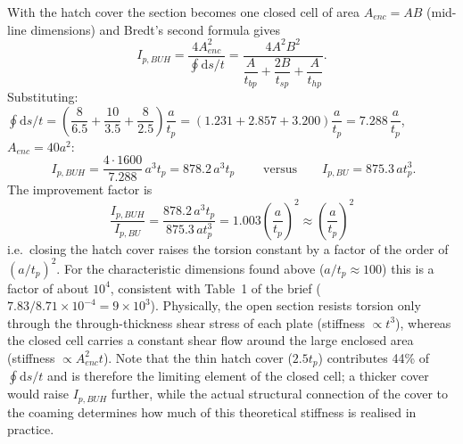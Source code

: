 \bigskip
With the hatch cover the section becomes one closed cell of area $A_{enc}=AB$ (mid-line dimensions) and Bredt's second formula gives
\begin{equation}
  I_{p,BUH}=\frac{4A_{enc}^2}{\oint\mathrm{d}s/t}=\frac{4A^2B^2}{\dfrac{A}{t_{bp}}+\dfrac{2B}{t_{sp}}+\dfrac{A}{t_{hp}}} .
\end{equation}
Substituting: $\oint\mathrm{d}s/t=\left(\dfrac{8}{6.5}+\dfrac{10}{3.5}+\dfrac{8}{2.5}\right)\dfrac{a}{t_p}=\left(1.231+2.857+3.200\right)\dfrac{a}{t_p}=7.288\,\dfrac{a}{t_p}$, $A_{enc}=40a^2$:
\begin{equation}
  \boxed{\;I_{p,BUH}=\frac{4\cdot1600}{7.288}\,a^3t_p=878.2\,a^3t_p\;}
  \qquad\text{versus}\qquad I_{p,BU}=875.3\,at_p^3 .
\end{equation}
The improvement factor is
\begin{equation}
  \boxed{\;\frac{I_{p,BUH}}{I_{p,BU}}=\frac{878.2\,a^3t_p}{875.3\,at_p^3}=1.003\left(\frac{a}{t_p}\right)^2\approx\left(\frac{a}{t_p}\right)^2\;}
\end{equation}
i.e.\ closing the hatch cover raises the torsion constant by a factor of the order of $(a/t_p)^2$. For the characteristic dimensions found above ($a/t_p\approx100$) this is a factor of about $10^4$, consistent with Table~1 of the brief ($7.83/8.71\times10^{-4}=9\times10^{3}$). Physically, the open section resists torsion only through the through-thickness shear stress of each plate (stiffness $\propto t^3$), whereas the closed cell carries a constant shear flow around the large enclosed area (stiffness $\propto A_{enc}^2t$). Note that the thin hatch cover ($2.5t_p$) contributes 44\% of $\oint\mathrm{d}s/t$ and is therefore the limiting element of the closed cell; a thicker cover would raise $I_{p,BUH}$ further, while the actual structural connection of the cover to the coaming determines how much of this theoretical stiffness is realised in practice.
